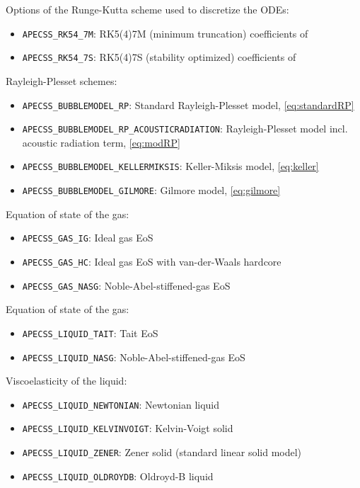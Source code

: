 Options of the Runge-Kutta scheme used to discretize the ODEs:\vspace{-1em}
\begin{itemize}[noitemsep]
  \item {\tt APECSS\_RK54\_7M}: RK5(4)7M (minimum truncation) coefficients of \citet{Dormand1980}
  \item {\tt APECSS\_RK54\_7S}: RK5(4)7S (stability optimized) coefficients of \citet{Dormand1980}
\end{itemize}

Rayleigh-Plesset schemes:\vspace{-1em}
\begin{itemize}[noitemsep]
  \item {\tt APECSS\_BUBBLEMODEL\_RP}: Standard Rayleigh-Plesset model, \eqref{eq:standardRP}
  \item {\tt APECSS\_BUBBLEMODEL\_RP\_ACOUSTICRADIATION}: Rayleigh-Plesset model incl. acoustic radiation term, \eqref{eq:modRP}
  \item {\tt APECSS\_BUBBLEMODEL\_KELLERMIKSIS}: Keller-Miksis model, \eqref{eq:keller}
  \item {\tt APECSS\_BUBBLEMODEL\_GILMORE}: Gilmore model, \eqref{eq:gilmore}
\end{itemize}

Equation of state of the gas:\vspace{-1em}
\begin{itemize}[noitemsep]
  \item {\tt APECSS\_GAS\_IG}: Ideal gas EoS
  \item {\tt APECSS\_GAS\_HC}: Ideal gas EoS with van-der-Waals hardcore
  \item {\tt APECSS\_GAS\_NASG}: Noble-Abel-stiffened-gas EoS
\end{itemize}

Equation of state of the gas:\vspace{-1em}
\begin{itemize}[noitemsep]
  \item {\tt APECSS\_LIQUID\_TAIT}: Tait EoS
  \item {\tt APECSS\_LIQUID\_NASG}: Noble-Abel-stiffened-gas EoS
\end{itemize}

Viscoelasticity of the liquid:\vspace{-1em}
\begin{itemize}[noitemsep]
  \item {\tt APECSS\_LIQUID\_NEWTONIAN}: Newtonian liquid
  \item {\tt APECSS\_LIQUID\_KELVINVOIGT}: Kelvin-Voigt solid
  \item {\tt APECSS\_LIQUID\_ZENER}: Zener solid (standard linear solid model)
  \item {\tt APECSS\_LIQUID\_OLDROYDB}: Oldroyd-B liquid
\end{itemize}

